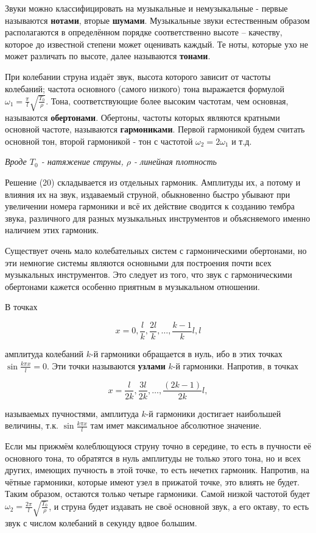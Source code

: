 Звуки можно классифицировать на музыкальные и немузыкальные - первые называются \textbf{нотами}, вторые \textbf{шумами}. Музыкальные звуки естественным образом располагаются в определённом порядке соответственно высоте -- качеству, которое до известной степени может оценивать каждый. Те ноты, которые ухо не может различать по высоте, далее называются \textbf{тонами}.

При колебании струна издаёт звук, высота которого зависит от частоты колебаний; частота основного (самого низкого) тона выражается формулой $\omega_1 = \frac{\pi}{l} \sqrt{\frac{T_0}{\rho}}$. Тона, соответствующие более высоким частотам, чем основная, называются \textbf{обертонами}. Обертоны, частоты которых являются кратными основной частоте, называются \textbf{гармониками}. Первой гармоникой будем считать основной тон, второй гармоникой - тон с частотой $\omega_2 = 2 \omega_1$ и т.д.

\textit{Вроде $T_0$ - натяжение струны, $\rho$ - линейная плотность}

Решение (20) складывается из отдельных гармоник. Амплитуды их, а потому и влияния их на звук, издаваемый струной, обыкновенно быстро убывают при увеличении номера гармоники и всё их действие сводится к созданию тембра звука, различного для разных музыкальных инструментов и объясняемого именно наличием этих гармоник.

Существует очень мало колебательных систем с гармоническими обертонами, но эти немногие системы являются основными для построения почти всех музыкальных инструментов. Это следует из того, что звук с гармоническими обертонами кажется особенно приятным в музыкальном отношении.

В точках

\[
	x = 0, \frac{l}{k}, \frac{2l}{k}, \dots, \frac{k-1}{k} l, l
\]

амплитуда колебаний $k$-й гармоники обращается в нуль, ибо в этих точках $\sin \frac{k \pi x}{l}=0$. Эти точки называются \textbf{узлами} $k$-й гармоники. Напротив, в точках

\[
	x = \frac{l}{2k}, \frac{3l}{2k}, \dots, \frac{(2k-1)}{2k} l,
\]

называемых пучностями, амплитуда $k$-й гармоники достигает наибольшей величины, т.к. $\sin \frac{k \pi x}{l}$ там имет максимальное абсолютное значение.

Если мы прижмём колеблющуюся струну точно в середине, то есть в пучности её основного тона, то обратятся в нуль амплитуды не только этого тона, но и всех других, имеющих пучность в этой точке, то есть нечетнх гармоник. Напротив, на чётные гармоники, которые имеют узел в прижатой точке, это влиять не будет. Таким образом, остаются только четыре гармоники. Самой низкой частотой будет $\omega_2 = \frac{2 \pi}{l} \sqrt{\frac{T_0}{\rho}}$, и струна будет издавать не своё основной звук, а его октаву, то есть звук с числом колебаний в секунду вдвое большим.
